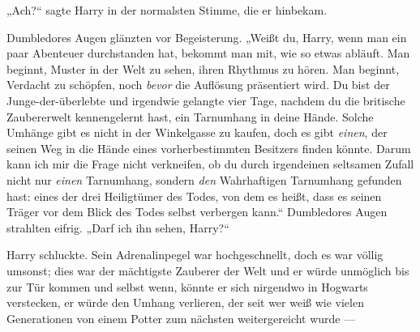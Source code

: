 „Ach?“ sagte Harry in der normalsten Stimme, die er hinbekam.

Dumbledores Augen glänzten vor Begeisterung.
„Weißt du, Harry, wenn man ein paar Abenteuer durchstanden hat, bekommt man mit, wie so etwas abläuft. Man beginnt, Muster in der Welt zu sehen, ihren Rhythmus zu hören. Man beginnt, Verdacht zu schöpfen, noch \emph{bevor} die Auflösung präsentiert wird. Du bist der Junge-der-überlebte und irgendwie gelangte vier Tage, nachdem du die britische Zaubererwelt kennengelernt hast, ein Tarnumhang in deine Hände. Solche Umhänge gibt es nicht in der Winkelgasse zu kaufen, doch es gibt \emph{einen}, der seinen Weg in die Hände eines vorherbestimmten Besitzers finden könnte. Darum kann ich mir die Frage nicht verkneifen, ob du durch irgendeinen seltsamen Zufall nicht nur \emph{einen} Tarnumhang, sondern \emph{den} Wahrhaftigen Tarnumhang gefunden hast: eines der drei Heiligtümer des Todes, von dem es heißt, dass es seinen Träger vor dem Blick des Todes selbst verbergen kann.“ Dumbledores Augen strahlten eifrig.
„Darf ich ihn sehen, Harry?“

Harry schluckte. Sein Adrenalinpegel war hochgeschnellt, doch es war völlig umsonst; dies war der mächtigste Zauberer der Welt und er würde unmöglich bis zur Tür kommen und selbst wenn, könnte er sich nirgendwo in Hogwarts verstecken, er würde den Umhang verlieren, der seit wer weiß wie vielen Generationen von einem Potter zum nächsten weitergereicht wurde —

